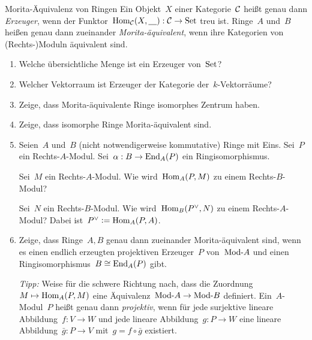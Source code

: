\documentclass{uebblatt}
\begin{document}
\begin{aufgabe}{Morita-Äquivalenz von Ringen
}
Ein Objekt~$X$ einer Kategorie~$\mathcal{C}$ heißt genau dann \emph{Erzeuger}, wenn der
Funktor~$\mathrm{Hom}_{\mathcal{C}}(X, \underline{\quad}) : \mathcal{C} \to \mathrm{Set}$ treu ist. Ringe~$A$
und~$B$ heißen genau dann zueinander \emph{Morita-äquivalent}, wenn ihre
Kategorien von (Rechts-)Moduln äquivalent sind.

\begin{enumerate}
\item Welche übersichtliche Menge ist ein Erzeuger von~$\mathrm{Set}$?
\item Welcher Vektorraum ist Erzeuger der Kategorie der~$k$-Vektorräume?
\item Zeige, dass Morita-äquivalente Ringe isomorphes Zentrum haben.
\item Zeige, dass isomorphe Ringe Morita-äquivalent sind.
\item Seien~$A$ und~$B$ (nicht notwendigerweise kommutative) Ringe mit Eins.
Sei~$P$ ein Rechts-$A$-Modul. Sei~$\alpha : B \to \mathrm{End}_A(P)$ ein
Ringisomorphismus.

Sei~$M$ ein Rechts-$A$-Modul. Wie wird~$\mathrm{Hom}_A(P,M)$ zu einem Rechts-$B$-Modul?

Sei~$N$ ein Rechts-$B$-Modul. Wie wird~$\mathrm{Hom}_B(P^\vee,N)$ zu einem
Rechts-$A$-Modul? Dabei ist~$P^\vee \vcentcolon= \mathrm{Hom}_A(P,A)$.

\item Zeige, dass Ringe~$A,B$ genau dann zueinander Morita-äquivalent sind,
wenn es einen endlich erzeugten projektiven Erzeuger~$P$ von~$\mathrm{Mod}\text{-}A$ und
einen Ringisomorphismus~$B \cong \mathrm{End}_A(P)$ gibt.

{\tiny
\emph{Tipp:} Weise für die schwere Richtung nach, dass die Zuordnung~$M \mapsto
\mathrm{Hom}_A(P,M)$ eine Äquivalenz~$\mathrm{Mod}\text{-}A \to \mathrm{Mod}\text{-}B$ definiert.
Ein~$A$-Modul~$P$ heißt genau dann \emph{projektiv}, wenn für jede surjektive lineare
Abbildung~$f : V \to W$ und jede lineare Abbildung~$g : P \to W$ eine lineare
Abbildung~$\bar g : P \to V$ mit~$g = f \circ \bar g$ existiert.\par}
\end{enumerate}
\end{aufgabe}
\end{document}
